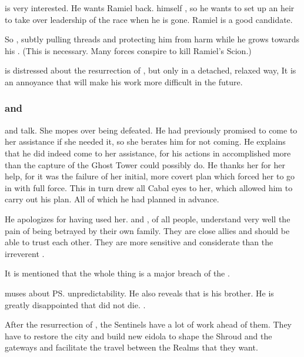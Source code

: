 \Azraid{} is very interested. 
He wants Ramiel back. 
\Azraid{} himself , so he wants to set up an heir to take over leadership of the \resphan{} race when he is gone. 
Ramiel is a good candidate. 

So \Azraid{} , subtly pulling threads and protecting him from harm while he grows towards his \apotheosis. 
(This is necessary. Many forces conspire to kill Ramiel's Scion.)

\Azraid{} is distressed about the resurrection of \Nithdornazsh, but only in a detached, relaxed way, 
It is an annoyance that will make his work more difficult in the future. 






\subsubsection{\Secherdamon{} and \Nzessuacrith}
\Secherdamon{} and \Nzessuacrith{} talk. 
She mopes over being defeated. 
He had previously promised to come to her assistance if she needed it, so she berates him for not coming. 
He explains that he did indeed come to her assistance, for his actions in \Malcur accomplished more than the capture of the Ghost Tower could possibly do. 
He thanks her for her help, for it was the failure of her initial, more covert plan which forced her to go in with full force. 
This in turn drew all Cabal eyes to her, which allowed him to carry out his plan. 
All of which he had planned in advance. 

He apologizes for having used her. 
\Secherdamon{} and \Nzessuacrith, of all people, understand very well the pain of being betrayed by their own family. 
They are close allies and should be able to trust each other. 
They are more sensitive and considerate than the irreverent \Ishnaruchaefir. 

It is mentioned that the whole thing is a major breach of the \charade. 

\Secherdamon{} muses about \ps{\Ishnaruchaefir} unpredictability. 
He also reveals that \Ishnaruchaefir{} is his brother. 
He is greatly disappointed that \Ishnaruchaefir{} did not die. 
\Secherdamon{} . 

After the resurrection of \Nithdornazsh, the Sentinels have a lot of work ahead of them.
They have to restore the city and build new eidola to shape the Shroud and the gateways and facilitate the travel between the Realms that they want. 

